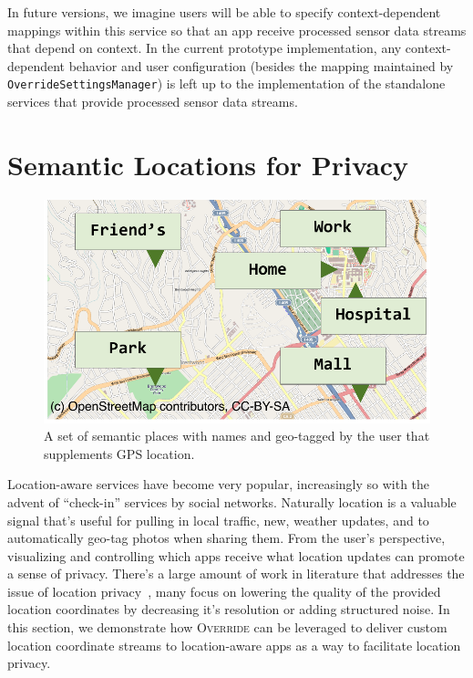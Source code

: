 \documentclass[10pt]{sensys-proc}
\begin{document}
In future versions, we imagine users will be able to specify context-dependent mappings within this service so that an app receive processed sensor data streams that depend on context. In the current prototype implementation, any context-dependent behavior and user configuration (besides the mapping maintained by \texttt{OverrideSettingsManager}) is left up to the implementation of the standalone services that provide processed sensor data streams.


\section{Semantic Locations for Privacy}
\label{Sec:example}

\begin{figure}[h]
\label{fig:semantic_places}
\includegraphics[width=\columnwidth]{../figures/semantic_location_3.pdf}
\caption{A set of semantic places with names and geo-tagged by the user that supplements GPS location.}
\end{figure}

Location-aware services have become very popular, increasingly so with the advent of ``check-in'' services by social networks. Naturally location is a valuable signal that's useful for pulling in local traffic, new, weather updates, and to automatically geo-tag photos when sharing them. From the user's perspective, visualizing and controlling which apps receive what location updates can promote a sense of privacy. There's a large amount of work in literature that addresses the issue of location privacy~\cite{krumm:survey}, many focus on lowering the quality of the provided location coordinates by decreasing it's resolution or adding structured noise. In this section, we demonstrate how \textsc{Override} can be leveraged to deliver custom location coordinate streams to location-aware apps as a way to facilitate location privacy.
\end{document}
